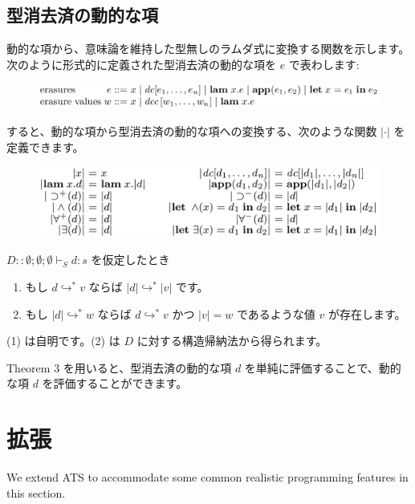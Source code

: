 \documentclass[submit,techreq,noauthor,onecolumn]{ipsj}
\begin{document}
\subsection{型消去済の動的な項}

動的な項から、意味論を維持した型無しのラムダ式に変換する関数を示します。
次のように形式的に定義された型消去済の動的な項を $e$ で表わします:

\begin{figure}[h]
\centering
\includegraphics[width=13cm]{img/infig3_erasure.png}
\end{figure}

\noindent すると、動的な項から型消去済の動的な項への変換する、次のような関数 $|\cdot|$ を定義できます。

\begin{figure}[h]
\centering
\includegraphics[width=12cm]{img/infig3_trans_erasure.png}
\end{figure}

$D :: \emptyset; \emptyset; \emptyset \vdash_S d : s$ を仮定したとき

\begin{enumerate}
  \item もし $d \hookrightarrow^* v$ ならば $|d| \hookrightarrow^* |v|$ です。
  \item もし $|d| \hookrightarrow^* w$ ならば $d \hookrightarrow^* v$ かつ $|v| = w$ であるような値 $v$ が存在します。
\end{enumerate}

(1) は自明です。(2) は $D$ に対する構造帰納法から得られます。

\noindent Theorem 3 を用いると、型消去済の動的な項 $d$ を単純に評価することで、動的な項 $d$ を評価することができます。

\section{拡張}

We extend ATS to accommodate some common realistic programming features
in this section.
\end{document}
